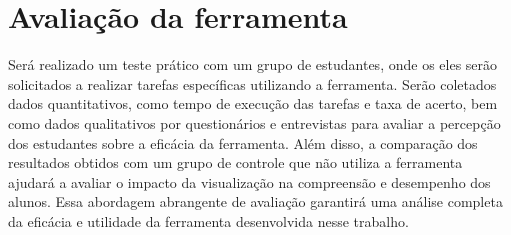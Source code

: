 


\section{Avaliação da ferramenta}
Será realizado um teste prático com um grupo de estudantes, onde os eles serão solicitados a realizar tarefas específicas utilizando a ferramenta. Serão coletados dados quantitativos, como tempo de execução das tarefas e taxa de acerto, bem como dados qualitativos por questionários e entrevistas para avaliar a percepção dos estudantes sobre a eficácia da ferramenta. Além disso, a comparação dos resultados obtidos com um grupo de controle que não utiliza a ferramenta ajudará a avaliar o impacto da visualização na compreensão e desempenho dos alunos. Essa abordagem abrangente de avaliação garantirá uma análise completa da eficácia e utilidade da ferramenta desenvolvida nesse trabalho.

